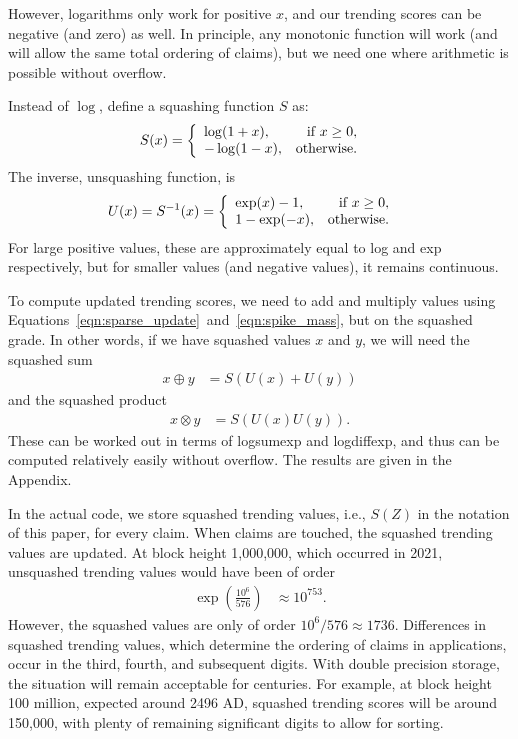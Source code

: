 \documentclass[a4paper, 12pt]{article}
\begin{document}
However,
logarithms only work for positive $x$, and our trending scores can be
negative (and zero) as well. In principle, any monotonic function will work
(and will allow the same total ordering of claims),
but we need one where arithmetic is possible without overflow.

Instead of $\log$, define a squashing function $S$ as:
\begin{align}
S(x) &=
    \left\{
        \begin{array}{lr}
            \log (1 + x), & \textnormal{if } x \geq 0, \\
            -\log(1 - x), & \textnormal{otherwise}.
        \end{array}
    \right.
\end{align}
The inverse, unsquashing function, is
\begin{align}
U(x) = S^{-1}(x) &=
    \left\{
        \begin{array}{lr}
            \exp(x) - 1,  & \textnormal{if } x \geq 0, \\
            1 - \exp(-x), & \textnormal{otherwise}.
        \end{array}
    \right.
\end{align}
For large positive values, these are approximately equal to log and exp
respectively, but for smaller values (and negative values), it remains
continuous.

To compute updated trending scores, we need to add and multiply
values using Equations~\ref{eqn:sparse_update}~and~\ref{eqn:spike_mass}, but on the
squashed grade. In other words, if we have squashed values $x$ and
$y$, we will need the squashed sum
\begin{align}
x \oplus y &= S(U(x) + U(y))
\end{align}
and the squashed product
\begin{align}
x \otimes y &= S(U(x)U(y)).
\end{align}
These can be worked out in terms of logsumexp and logdiffexp, and thus can
be computed relatively easily without overflow.
The results are given in the Appendix.

In the actual code, we store squashed trending values, i.e., $S(Z)$ in the
notation of this paper, for every claim. When claims are touched, the
squashed trending values are updated. At block height 1,000,000, which occurred
in 2021, unsquashed trending values would have been of order
\begin{align}
\exp\left(\frac{10^{6}}{576}\right) &\approx 10^{753}.
\end{align}
However, the squashed values are only of order $10^6 / 576 \approx 1736$.
Differences in squashed trending values, which determine the ordering of claims
in applications, occur in the third, fourth, and subsequent digits.
With double precision storage, the situation will remain acceptable for
centuries. For example, at block height 100 million, expected around 2496 AD,
squashed trending scores will be around 150,000, with plenty of remaining
significant digits to allow for sorting.
\end{document}
